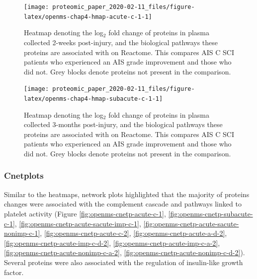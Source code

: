 \documentclass[9pt,lineno]{elife}
\begin{document}
\begin{landscape}



\begin{figure}

{\centering \texttt{[image: proteomic\_paper\_2020-02-11\_files/figure-latex/openms-chap4-hmap-acute-c-1-1]} 

}

\caption{Heatmap denoting the log\(_2\) fold change of proteins in plasma collected 2-weeks post-injury, and the biological pathways these proteins are associated with on Reactome. This compares AIS C SCI patients who experienced an AIS grade improvement and those who did not. Grey blocks denote proteins not present in the comparison.}\label{fig:openms-chap4-hmap-acute-c-1}
\end{figure}

\end{landscape}
\begin{landscape}



\begin{figure}

{\centering \texttt{[image: proteomic\_paper\_2020-02-11\_files/figure-latex/openms-chap4-hmap-subacute-c-1-1]} 

}

\caption{Heatmap denoting the log\(_2\) fold change of proteins in plasma collected 3-months post-injury, and the biological pathways these proteins are associated with on Reactome. This compares AIS C SCI patients who experienced an AIS grade improvement and those who did not. Grey blocks denote proteins not present in the comparison.}\label{fig:openms-chap4-hmap-subacute-c-1}
\end{figure}

\end{landscape}
\clearpage

\hypertarget{cnetplot-chap3}{%
\subsubsection{Cnetplots}\label{cnetplot-chap3}}

Similar to the heatmaps, network plots highlighted that the majority of proteins changes were associated with the complement cascade and pathways linked to platelet activity (Figure \ref{fig:openms-cnetp-acute-c-1}, \ref{fig:openms-cnetp-subacute-c-1}, \ref{fig:openms-cnetp-acute-sacute-imp-c-1}, \ref{fig:openms-cnetp-acute-sacute-nonimp-c-1}, \ref{fig:openms-cnetp-acute-c-2}, \ref{fig:openms-cnetp-acute-a-d-2}, \ref{fig:openms-cnetp-acute-imp-c-d-2}, \ref{fig:openms-cnetp-acute-imp-c-a-2}, \ref{fig:openms-cnetp-acute-nonimp-c-a-2}, \ref{fig:openms-cnetp-acute-nonimp-c-d-2}).
Several proteins were also associated with the regulation of insulin-like growth factor.
\end{document}

